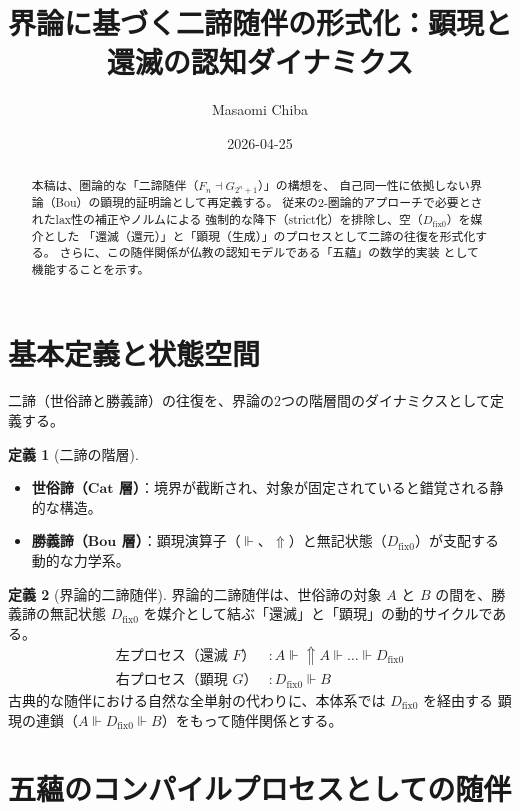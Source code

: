 \documentclass[11pt,a4paper]{article}
\theoremstyle{definition}
\newtheorem{definition}{定義}[section]
\newcommand{\dfix}{D_{\mathrm{fix}0}} %
\newcommand{\metanegation}{\Uparrow}
\newcommand{\aletheiai}{\Vdash} %
\newcommand{\Bou}{\mathbf{Bou}}
\newcommand{\Cat}{\mathbf{Cat}}
\begin{document}
\title{界論に基づく二諦随伴の形式化：顕現と還滅の認知ダイナミクス}
\author{Masaomi Chiba}
\date{2026-04-25}
\maketitle

\begin{abstract}
本稿は、圏論的な「二諦随伴（$F_n \dashv G_{2^n+1}$）」の構想を、
自己同一性に依拠しない界論（Bou）の顕現的証明論として再定義する。
従来の2-圏論的アプローチで必要とされたlax性の補正やノルムによる
強制的な降下（strict化）を排除し、空（$\dfix$）を媒介とした
「還滅（還元）」と「顕現（生成）」のプロセスとして二諦の往復を形式化する。
さらに、この随伴関係が仏教の認知モデルである「五蘊」の数学的実装
として機能することを示す。
\end{abstract}

\section{基本定義と状態空間}

二諦（世俗諦と勝義諦）の往復を、界論の2つの階層間のダイナミクスとして定義する。

\begin{definition}[二諦の階層]
\begin{itemize}
    \item \textbf{世俗諦（$\Cat$ 層）}：境界が截断され、対象が固定されていると錯覚される静的な構造。
    \item \textbf{勝義諦（$\Bou$ 層）}：顕現演算子（$\aletheiai$、$\metanegation$）と無記状態（$\dfix$）が支配する動的な力学系。
\end{itemize}
\end{definition}

\begin{definition}[界論的二諦随伴]
界論的二諦随伴は、世俗諦の対象 $A$ と $B$ の間を、勝義諦の無記状態 $\dfix$
を媒介として結ぶ「還滅」と「顕現」の動的サイクルである。
\begin{align*}
    \text{左プロセス（還滅 $F$）} &: A \aletheiai \metanegation A \aletheiai \dots \aletheiai \dfix \\
    \text{右プロセス（顕現 $G$）} &: \dfix \aletheiai B
\end{align*}
古典的な随伴における自然な全単射の代わりに、本体系では $\dfix$ を経由する
顕現の連鎖（$A \aletheiai \dfix \aletheiai B$）をもって随伴関係とする。
\end{definition}

\section{五蘊のコンパイルプロセスとしての随伴}
\end{document}
